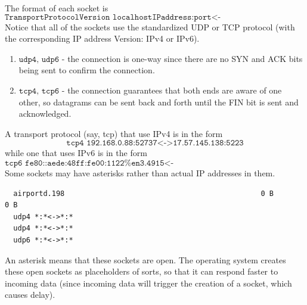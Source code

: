\documentclass{article}
\begin{document}
  The format of each socket is
  \[\texttt{TransportProtocolVersion localhostIPaddress:port<->remoteIPaddress:port}\]
  Notice that all of the sockets use the standardized UDP or TCP protocol (with the corresponding IP address Version: IPv4 or IPv6). 
  \begin{enumerate}
      \item $\texttt{udp4, udp6}$ - the connection is one-way since there are no SYN and ACK bits being sent to confirm the connection. 
      \item $\texttt{tcp4, tcp6}$ - the connection guarantees that both ends are aware of one other, so datagrams can be sent back and forth until the FIN bit is sent and acknowledged. 
  \end{enumerate}
  A transport protocol (say, tcp) that use IPv4 is in the form
  \[\texttt{tcp4 192.168.0.88:52737<->17.57.145.138:5223}\]
  while one that uses IPv6 is in the form 
  \[\texttt{tcp6 fe80::aede:48ff:fe00:1122\%en3.4915<->fe80::aede:48ff:fe33:445\%en3.5960}\]
  Some sockets may have asterisks rather than actual IP addresses in them. 
  \begin{lstlisting}
  airportd.198                                              0 B        0 B
  udp4 *:*<->*:*
  udp4 *:*<->*:*
  udp6 *:*<->*:*
  \end{lstlisting}
  An asterisk means that these sockets are open. The operating system creates these open sockets as placeholders of sorts, so that it can respond faster to incoming data (since incoming data will trigger the creation of a socket, which causes delay). 
\end{document}
